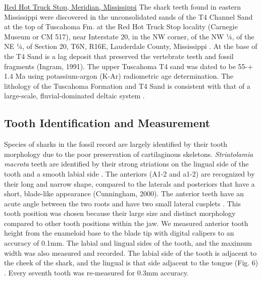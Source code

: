 \documentclass[]{rsos}%
\begin{document}
\underline{Red Hot Truck Stop, Meridian, Mississippi}
The shark teeth found in eastern Mississippi were discovered in the unconsolidated sands of the T4 Channel Sand at the top of Tuscahoma Fm. at the Red Hot Truck Stop locality (Carnegie Museum or CM 517), near Interstate 20, in the NW corner, of the NW ¼, of the NE ¼, of Section 20, T6N, R16E, Lauderdale County, Mississippi \cite{ingram1991tuscahoma}. 
At the base of the T4 Sand is a lag deposit that preserved the vertebrate teeth and fossil fragments (Ingram, 1991). The upper Tuscahoma T4 sand was dated to be 55-+ 1.4 Ma \cite{mancini1995geochronology} using potassium-argon (K-Ar) radiometric age determination.
The lithology of the Tuscahoma Formation and T4 Sand is consistent with that of a large-scale, fluvial-dominated deltaic system \cite{Beard2009}. 

\subsection{Tooth Identification and Measurement}
Species of sharks in the fossil record are largely identified by their tooth morphology \cite{Cappetta2012} due to the poor preservation of cartilaginous skeletons. 
\emph{Striatolamia macrota} teeth are identified by their strong striations on the lingual side of the tooth and a smooth labial side \cite{Cappetta2012}. 
The anteriors (A1-2 and a1-2) are recognized by their long and narrow shape, compared to the laterals and posteriors that have a short, blade-like appearance (Cunningham, 2000). 
The anterior teeth have an acute angle between the two roots and have two small lateral cusplets \cite{Padilla2014, Cappetta2012}. 
This tooth position was chosen because their large size and distinct morphology compared to other tooth positions within the jaw. 
We measured anterior tooth height from the enameloid base to the blade tip with digital calipers to an accuracy of 0.1mm. 
The labial and lingual sides of the tooth, and the maximum width was also measured and recorded. 
The labial side of the tooth is adjacent to the cheek of the shark, and the lingual is that side adjacent to the tongue (Fig. 6) \cite{Cappetta2012}.  
Every seventh tooth was re-measured for 0.3mm accuracy. 
\end{document}
